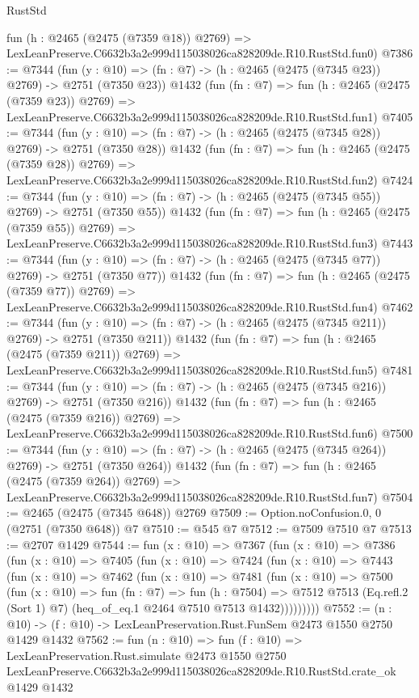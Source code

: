 \begin{lexlean}{RustStd}
\begin{coremodule}
    fun (h : @2465 (@2475 (@7359 @18)) @2769) =>
    LexLeanPreserve.C6632b3a2e999d115038026ca828209de.R10.RustStd.fun0)
@7386 := @7344
    (fun (y : @10) => (fn : @7) -> (h : @2465 (@2475 (@7345 @23)) @2769) -> @2751 (@7350 @23))
    @1432
    (fun (fn : @7) =>
    fun (h : @2465 (@2475 (@7359 @23)) @2769) =>
    LexLeanPreserve.C6632b3a2e999d115038026ca828209de.R10.RustStd.fun1)
@7405 := @7344
    (fun (y : @10) => (fn : @7) -> (h : @2465 (@2475 (@7345 @28)) @2769) -> @2751 (@7350 @28))
    @1432
    (fun (fn : @7) =>
    fun (h : @2465 (@2475 (@7359 @28)) @2769) =>
    LexLeanPreserve.C6632b3a2e999d115038026ca828209de.R10.RustStd.fun2)
@7424 := @7344
    (fun (y : @10) => (fn : @7) -> (h : @2465 (@2475 (@7345 @55)) @2769) -> @2751 (@7350 @55))
    @1432
    (fun (fn : @7) =>
    fun (h : @2465 (@2475 (@7359 @55)) @2769) =>
    LexLeanPreserve.C6632b3a2e999d115038026ca828209de.R10.RustStd.fun3)
@7443 := @7344
    (fun (y : @10) => (fn : @7) -> (h : @2465 (@2475 (@7345 @77)) @2769) -> @2751 (@7350 @77))
    @1432
    (fun (fn : @7) =>
    fun (h : @2465 (@2475 (@7359 @77)) @2769) =>
    LexLeanPreserve.C6632b3a2e999d115038026ca828209de.R10.RustStd.fun4)
@7462 := @7344
    (fun (y : @10) => (fn : @7) -> (h : @2465 (@2475 (@7345 @211)) @2769) -> @2751 (@7350 @211))
    @1432
    (fun (fn : @7) =>
    fun (h : @2465 (@2475 (@7359 @211)) @2769) =>
    LexLeanPreserve.C6632b3a2e999d115038026ca828209de.R10.RustStd.fun5)
@7481 := @7344
    (fun (y : @10) => (fn : @7) -> (h : @2465 (@2475 (@7345 @216)) @2769) -> @2751 (@7350 @216))
    @1432
    (fun (fn : @7) =>
    fun (h : @2465 (@2475 (@7359 @216)) @2769) =>
    LexLeanPreserve.C6632b3a2e999d115038026ca828209de.R10.RustStd.fun6)
@7500 := @7344
    (fun (y : @10) => (fn : @7) -> (h : @2465 (@2475 (@7345 @264)) @2769) -> @2751 (@7350 @264))
    @1432
    (fun (fn : @7) =>
    fun (h : @2465 (@2475 (@7359 @264)) @2769) =>
    LexLeanPreserve.C6632b3a2e999d115038026ca828209de.R10.RustStd.fun7)
@7504 := @2465 (@2475 (@7345 @648)) @2769
@7509 := Option.noConfusion.{0, 0} (@2751 (@7350 @648)) @7
@7510 := @545 @7
@7512 := @7509 @7510 @7
@7513 := @2707 @1429
@7544 := fun (x : @10) =>
  @7367
    (fun (x : @10) =>
    @7386
      (fun (x : @10) =>
      @7405
        (fun (x : @10) =>
        @7424
          (fun (x : @10) =>
          @7443
            (fun (x : @10) =>
            @7462
              (fun (x : @10) =>
              @7481
                (fun (x : @10) =>
                @7500
                  (fun (x : @10) =>
                  fun (fn : @7) =>
                  fun (h : @7504) =>
                  @7512
                    @7513
                    (Eq.refl.{2} (Sort 1) @7)
                    (heq_of_eq.{1} @2464 @7510 @7513 @1432)))))))))
@7552 := (n : @10) -> (f : @10) -> LexLeanPreservation.Rust.FunSem @2473 @1550 @2750 @1429 @1432
@7562 := fun (n : @10) =>
  fun (f : @10) =>
  LexLeanPreservation.Rust.simulate
    @2473
    @1550
    @2750
    LexLeanPreserve.C6632b3a2e999d115038026ca828209de.R10.RustStd.crate_ok
    @1429
    @1432
\end{coremodule}
\end{lexlean}
